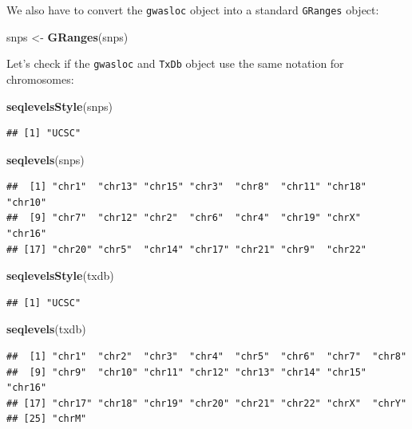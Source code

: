 \documentclass[9pt,a4paper,]{extarticle}
\newenvironment{Shaded}{\begin{snugshade}}{\end{snugshade}}
\newcommand{\KeywordTok}[1]{\textcolor[rgb]{0.13,0.29,0.53}{\textbf{#1}}}
\newcommand{\StringTok}[1]{\textcolor[rgb]{0.31,0.60,0.02}{#1}}
\newcommand{\NormalTok}[1]{#1}
\begin{document}
We also have to convert the \texttt{gwasloc} object into a standard \texttt{GRanges} object:

\begin{Shaded}
\begin{Highlighting}[]
\NormalTok{snps <-}\StringTok{ }\KeywordTok{GRanges}\NormalTok{(snps)}
\end{Highlighting}
\end{Shaded}

Let's check if the \texttt{gwasloc} and \texttt{TxDb} object use the same notation for chromosomes:

\begin{Shaded}
\begin{Highlighting}[]
\KeywordTok{seqlevelsStyle}\NormalTok{(snps)}
\end{Highlighting}
\end{Shaded}

\begin{verbatim}
## [1] "UCSC"
\end{verbatim}

\begin{Shaded}
\begin{Highlighting}[]
\KeywordTok{seqlevels}\NormalTok{(snps)}
\end{Highlighting}
\end{Shaded}

\begin{verbatim}
##  [1] "chr1"  "chr13" "chr15" "chr3"  "chr8"  "chr11" "chr18" "chr10"
##  [9] "chr7"  "chr12" "chr2"  "chr6"  "chr4"  "chr19" "chrX"  "chr16"
## [17] "chr20" "chr5"  "chr14" "chr17" "chr21" "chr9"  "chr22"
\end{verbatim}

\begin{Shaded}
\begin{Highlighting}[]
\KeywordTok{seqlevelsStyle}\NormalTok{(txdb)}
\end{Highlighting}
\end{Shaded}

\begin{verbatim}
## [1] "UCSC"
\end{verbatim}

\begin{Shaded}
\begin{Highlighting}[]
\KeywordTok{seqlevels}\NormalTok{(txdb)}
\end{Highlighting}
\end{Shaded}

\begin{verbatim}
##  [1] "chr1"  "chr2"  "chr3"  "chr4"  "chr5"  "chr6"  "chr7"  "chr8" 
##  [9] "chr9"  "chr10" "chr11" "chr12" "chr13" "chr14" "chr15" "chr16"
## [17] "chr17" "chr18" "chr19" "chr20" "chr21" "chr22" "chrX"  "chrY" 
## [25] "chrM"
\end{verbatim}
\end{document}
